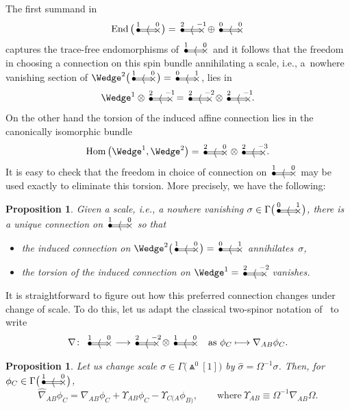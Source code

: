 \documentclass[pdftex]{sigma}%
\numberwithin{equation}{section}
\newtheorem{prop}[Theorem]{Proposition}
 { \theoremstyle{definition}
\newtheorem{Definition}[Theorem]{Definition}
\newtheorem{Note}[Theorem]{Note}
\newtheorem{Example}[Theorem]{Example}
\newtheorem{Remark}[Theorem]{Remark} }
\newcommand{\Hom}{\operatorname{Hom}}
\newcommand{\End}{\operatorname{End}}
\newcommand{\btwo}[2]{\begin{picture}(28,11)
\put(4,1.5){\makebox(0,0){$\bullet$}}
\put(24,1.5){\makebox(0,0){$\times$}}
\put(23,2.5){\line(-1,0){20}}
\put(23,0.5){\line(-1,0){20}}
\put(14,1.5){\makebox(0,0){$\langle$}}
\put(4,8){\makebox(0,0){$\scriptstyle #1$}}
\put(24,8){\makebox(0,0){$\scriptstyle #2$}}
\end{picture}}
\begin{document}
The first summand in
\[\End\big(\btwo{1}{0}\big)=\btwo{2}{-1}\oplus\btwo{0}{0}\]
captures the trace-free endomorphisms of $\btwo{1}{0}$ and it follows that the
freedom in choosing a connection on this spin bundle annihilating a scale,
i.e., a~nowhere vanishing section of $\Wedge^2\big(\btwo{1}{0}\big)=\btwo{0}{1}$, lies
in
\[\Wedge^1\otimes\btwo{2}{-1}=\btwo{2}{-2}\otimes\btwo{2}{-1}.\]
On the other hand the torsion of the induced affine connection lies in
the canonically isomorphic bundle
\[\Hom\big({\Wedge}^1,\Wedge^2\big)=\btwo{2}{0}\otimes\btwo{2}{-3}.\]
It is easy to check that the freedom in choice of connection on $\btwo{1}{0}$
may be used exactly to eliminate this torsion. More precisely, we have the
following:
\begin{prop}\label{one} Given a scale, i.e., a nowhere vanishing
$\sigma\in\Gamma\big(\btwo{0}{1}\big)$, there is a unique connection on $\btwo{1}{0}$
so that
\begin{itemize}\itemsep=0pt
\item the induced connection on $\Wedge^2\big(\btwo{1}{0}\big)=\btwo{0}{1}$
annihilates~$\sigma$,
\item the torsion of the induced connection on $\Wedge^1=\btwo{2}{-2}$
vanishes.
\end{itemize}
\end{prop}
It is straightforward to figure out how this preferred connection changes under
change of scale. To do this, let us adapt the classical two-spinor notation
of~\cite{OT} to write
\[\nabla\colon \ \btwo{1}{0}\longrightarrow\btwo{2}{-2}\otimes\btwo{1}{0}
\quad\mbox{as} \ \phi_C\longmapsto\nabla_{AB}\phi_C.\]
\begin{prop}\label{two} Let us change scale $\sigma\in\Gamma\big({\Wedge}^0[1]\big)$ by
$\widehat\sigma=\Omega^{-1}\sigma$. Then, for $\phi_C\in\Gamma\big(\btwo{1}{0}\big)$,
\begin{equation}\label{change_of_spin_connection}
\widehat\nabla_{AB}\phi_C=\nabla_{AB}\phi_C+\Upsilon_{AB}\phi_C
-\Upsilon_{C(A}\phi_{B)},\qquad\mbox{where} \
\Upsilon_{AB}\equiv\Omega^{-1}\nabla_{AB}\Omega.\end{equation}
\end{prop}
\end{document}
